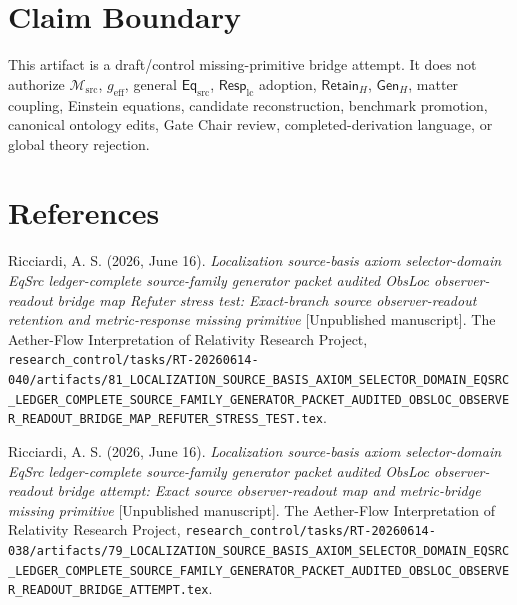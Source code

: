 \documentclass[11pt]{article}
\newcommand{\EqSrc}{\mathsf{Eq}_{\mathrm{src}}}
\newcommand{\RetainH}{\mathsf{Retain}_{H}}
\newcommand{\GenH}{\mathsf{Gen}_{H}}
\newcommand{\Msrc}{\mathcal{M}_{\mathrm{src}}}
\newcommand{\RespLC}{\mathsf{Resp}_{\mathrm{lc}}}
\newcommand{\geff}{g_{\mathrm{eff}}}
\begin{document}
\section{Claim Boundary}

This artifact is a draft/control missing-primitive bridge attempt. It
does not authorize \(\Msrc\), \(\geff\), general \(\EqSrc\),
\(\RespLC\) adoption, \(\RetainH\), \(\GenH\), matter coupling,
Einstein equations, candidate reconstruction, benchmark promotion,
canonical ontology edits, Gate Chair review, completed-derivation
language, or global theory rejection.

\section*{References}

Ricciardi, A. S. (2026, June 16). \textit{Localization source-basis
axiom selector-domain EqSrc ledger-complete source-family generator
packet audited ObsLoc observer-readout bridge map Refuter stress test:
Exact-branch source observer-readout retention and metric-response
missing primitive} [Unpublished manuscript]. The Aether-Flow
Interpretation of Relativity Research Project,
\texttt{research\_control/tasks/RT-20260614-040/artifacts/81\_LOCALIZATION\_SOURCE\_BASIS\_AXIOM\_SELECTOR\_DOMAIN\_EQSRC\_LEDGER\_COMPLETE\_SOURCE\_FAMILY\_GENERATOR\_PACKET\_AUDITED\_OBSLOC\_OBSERVER\_READOUT\_BRIDGE\_MAP\_REFUTER\_STRESS\_TEST.tex}.

Ricciardi, A. S. (2026, June 16). \textit{Localization source-basis
axiom selector-domain EqSrc ledger-complete source-family generator
packet audited ObsLoc observer-readout bridge attempt: Exact source
observer-readout map and metric-bridge missing primitive}
[Unpublished manuscript]. The Aether-Flow Interpretation of
Relativity Research Project,
\texttt{research\_control/tasks/RT-20260614-038/artifacts/79\_LOCALIZATION\_SOURCE\_BASIS\_AXIOM\_SELECTOR\_DOMAIN\_EQSRC\_LEDGER\_COMPLETE\_SOURCE\_FAMILY\_GENERATOR\_PACKET\_AUDITED\_OBSLOC\_OBSERVER\_READOUT\_BRIDGE\_ATTEMPT.tex}.
\end{document}
